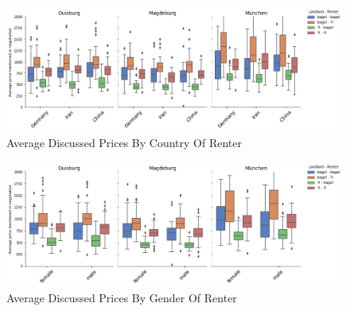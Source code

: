 \documentclass[runningheads]{llncs}
\begin{document}
\begin{figure}[h]
    \includegraphics[width=1\textwidth]{plots/country_box.png}
    \caption[eval]{Average Discussed Prices By Country Of Renter}
    \label{fig:country_avgprice}
\end{figure}

\begin{figure}[h]
    \includegraphics[width=1\textwidth]{plots/gender_box.png}
    \caption[eval]{Average Discussed Prices By Gender Of Renter}
    \label{fig:gender_avgprice}
\end{figure}
\end{document}
